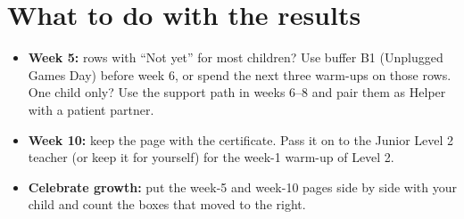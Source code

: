 \section{What to do with the results}
\begin{itemize}[itemsep=2pt]
  \item \textbf{Week 5:} rows with \enquote{Not yet} for most children? Use buffer B1 (Unplugged Games
        Day) before week 6, or spend the next three warm-ups on those rows. One child only? Use the
        support path in weeks 6--8 and pair them as Helper with a patient partner.
  \item \textbf{Week 10:} keep the page with the certificate. Pass it on to the Junior Level 2 teacher
        (or keep it for yourself) for the week-1 warm-up of Level 2.
  \item \textbf{Celebrate growth:} put the week-5 and week-10 pages side by side with your child and
        count the boxes that moved to the right.
\end{itemize}

